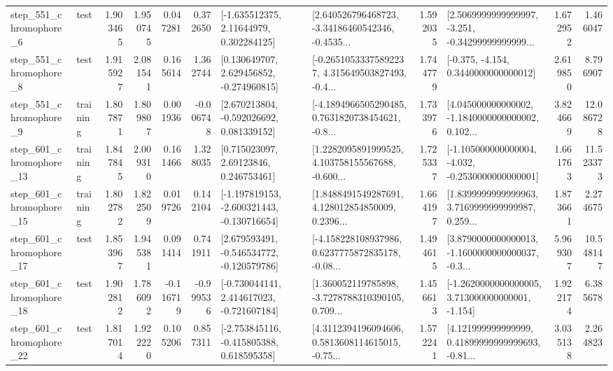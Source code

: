\begin{tabular}{llrrrrllrlrr}
   step\_551\_chromophore\_6 &      test &      1.903465 &    1.950745 &      0.047281 &  0.372650 &     [-1.635512375, 2.11644979, 0.302284125] &  [2.640526796468723, -3.34186460542346, -0.4535... &       1.592035 &  [2.5069999999999997, -3.251, -0.34299999999999... &            1.672952 &          1.466047 \\
   step\_551\_chromophore\_8 &      test &      1.915927 &    2.081541 &      0.165614 &  1.362744 &    [0.130649707, 2.629456852, -0.274960815] &  [-0.26510533375892237, 4.315649503827493, -0.4... &       1.744779 &               [-0.375, -4.154, 0.3440000000000012] &            2.619850 &          8.796907 \\
   step\_551\_chromophore\_9 &  training &      1.807871 &    1.809807 &      0.001936 & -0.006748 &    [2.670213804, -0.592026692, 0.081339152] &  [-4.1894966505290485, 0.7631820738454621, -0.8... &       1.733976 &  [4.045000000000002, -1.1840000000000002, 0.102... &            3.824669 &         12.086728 \\
  step\_601\_chromophore\_13 &  training &      1.847845 &    2.009310 &      0.161466 &  1.328035 &      [0.715023097, 2.69123846, 0.246753461] &  [1.2282095891999525, 4.103758155567688, -0.600... &       1.725337 &  [-1.105000000000004, -4.032, -0.2530000000000001] &            1.661763 &         11.523373 \\
  step\_601\_chromophore\_15 &  training &      1.802782 &    1.822509 &      0.019726 &  0.142104 &  [-1.197819153, -2.600321443, -0.130716654] &  [1.8488491549287691, 4.128012854850009, 0.2396... &       1.664197 &  [1.8399999999999963, 3.7169999999999987, 0.259... &            1.873661 &          2.274675 \\
  step\_601\_chromophore\_17 &      test &      1.853967 &    1.945381 &      0.091414 &  0.741911 &   [2.679593491, -0.546534772, -0.120579786] &  [-4.158228108937986, 0.6237775872835178, -0.08... &       1.494615 &  [3.8790000000000013, -1.1600000000000037, -0.3... &            5.969307 &         10.548147 \\
  step\_601\_chromophore\_18 &      test &      1.902812 &    1.786092 &     -0.116719 & -0.999536 &   [-0.730044141, 2.414617023, -0.721607184] &  [1.360052119785898, -3.7278788310390105, 0.709... &       1.456613 &   [-1.2620000000000005, 3.713000000000001, -1.154] &            1.922174 &          6.385678 \\
  step\_601\_chromophore\_22 &      test &      1.817014 &    1.922220 &      0.105206 &  0.857311 &   [-2.753845116, -0.415805388, 0.618595358] &  [4.3112394196094606, 0.5813608114615015, -0.75... &       1.572241 &  [4.121999999999999, 0.41899999999999693, -0.81... &            3.035138 &          2.264823 \\

\end{tabular}
